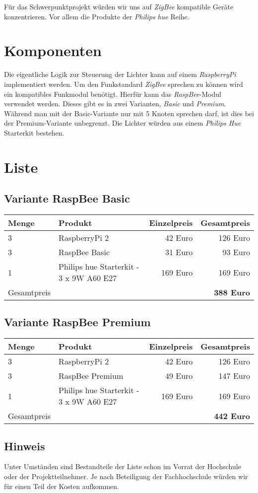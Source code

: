 \documentclass[a4paper,12pt]{article}
\begin{document}
Für das Schwerpunktprojekt würden wir uns auf \textit{ZigBee} kompatible Geräte
konzentrieren. Vor allem die Produkte der \textit{Philips hue} Reihe.

\section{Komponenten}

Die eigentliche Logik zur Steuerung der Lichter kann auf einem \textit{RaspberryPi}
implementiert werden. Um den Funkstandard \textit{ZigBee} sprechen zu können wird ein
kompatibles Funkmodul benötigt. Hierfür kann das \textit{RaspBee}-Modul verwendet werden.
Dieses gibt es in zwei Varianten, \textit{Basic} und \textit{Premium}. Während man mit der
Basic-Variante nur mit 5 Knoten sprechen darf, ist dies bei der Premium-Variante
unbegrenzt. Die Lichter würden aus einem \textit{Philips Hue} Starterkit bestehen.

\section{Liste}

\subsection{Variante RaspBee Basic}

\begin{tabular}{llrr}
   Menge & Produkt & Einzelpreis & Gesamtpreis\\
   \hline
   3 & RaspberryPi 2 & 42 Euro & 126 Euro\\
   3 & RaspBee Basic & 31 Euro & 93 Euro\\
   1 & Philips hue Starterkit - 3 x 9W A60 E27 & 169 Euro & 169 Euro\\
   \hline
   Gesamtpreis & & & \textbf{388 Euro}\\
\end{tabular}

\subsection{Variante RaspBee Premium}

\begin{tabular}{llrr}
   Menge & Produkt & Einzelpreis & Gesamtpreis\\
   \hline
   3 & RaspberryPi 2 & 42 Euro & 126 Euro\\
   3 & RaspBee Premium & 49 Euro & 147 Euro\\
   1 & Philips hue Starterkit - 3 x 9W A60 E27 & 169 Euro & 169 Euro\\
   \hline
   Gesamtpreis & & & \textbf{442 Euro}\\
\end{tabular}

\subsection{Hinweis}

Unter Umständen sind Bestandteile der Liste schon im Vorrat der Hochschule oder
der Projektteilnehmer. Je nach Beteiligung der Fachhochschule würden wir für einen
Teil der Kosten aufkommen.
\end{document}

